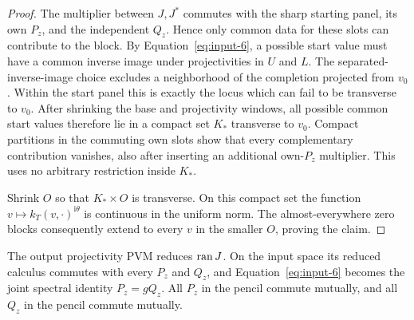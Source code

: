 \begin{proof}
The multiplier between $J,J^*$ commutes with the sharp starting
panel, its own $P_z$, and the independent $Q_z$.  Hence only common
data for these slots can contribute to the block.  By
Equation~\eqref{eq:input-6}, a possible start value must have a
common inverse image under projectivities in $U$ and $L$.
The separated-inverse-image choice excludes a neighborhood of the
completion projected from $v_0$.  Within the start panel this is
exactly the locus which can fail to be transverse to $v_0$.
After shrinking the base and projectivity windows, all possible
common start values therefore lie in a compact set $K_*$
transverse to $v_0$.  Compact partitions in the commuting own
slots show that every complementary contribution vanishes,
also after inserting an additional own-$P_z$ multiplier.
This uses no arbitrary restriction inside $K_*$.

Shrink $O$ so that $K_*\times O$ is transverse.  On this compact
set the function $v\mapsto k_T(v,\cdot)^{\mathrm i\theta}$ is
continuous in the uniform norm.  The almost-everywhere zero
blocks consequently extend to every $v$ in the smaller $O$,
proving the claim.
\end{proof}

\begin{proposition}
\label{prop:gluing-one-pencil}
The output projectivity PVM reduces $\operatorname{ran} J$.  On the input
space its reduced calculus commutes with every $P_z$ and $Q_z$,
and Equation~\eqref{eq:input-6} becomes the joint spectral identity
$P_z=gQ_z$.  All $P_z$ in the pencil commute mutually, and all
$Q_z$ in the pencil commute mutually.
\end{proposition}

